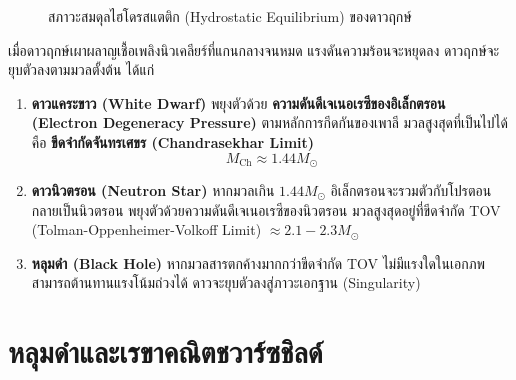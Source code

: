 \begin{figure}[H]
\centering
{}
\caption{สภาวะสมดุลไฮโดรสแตติก (Hydrostatic Equilibrium) ของดาวฤกษ์}
\label{fig:hydrostatic_equilibrium}
\end{figure}

เมื่อดาวฤกษ์เผาผลาญเชื้อเพลิงนิวเคลียร์ที่แกนกลางจนหมด แรงดันความร้อนจะหยุดลง ดาวฤกษ์จะยุบตัวลงตามมวลตั้งต้น ได้แก่
\begin{enumerate}
    \item \textbf{ดาวแคระขาว (White Dwarf)} พยุงตัวด้วย \textbf{ความดันดีเจเนอเรซีของอิเล็กตรอน (Electron Degeneracy Pressure)} ตามหลักการกีดกันของเพาลี มวลสูงสุดที่เป็นไปได้คือ \textbf{ขีดจำกัดจันทรเศขร (Chandrasekhar Limit)}
    \begin{equation}
    M_{\text{Ch}} \approx 1.44 M_\odot
    \end{equation}
    \item \textbf{ดาวนิวตรอน (Neutron Star)} หากมวลเกิน $1.44 M_\odot$ อิเล็กตรอนจะรวมตัวกับโปรตอนกลายเป็นนิวตรอน พยุงตัวด้วยความดันดีเจเนอเรซีของนิวตรอน มวลสูงสุดอยู่ที่ขีดจำกัด TOV (Tolman-Oppenheimer-Volkoff Limit) $\approx 2.1 - 2.3 M_\odot$
    \item \textbf{หลุมดำ (Black Hole)} หากมวลสารตกค้างมากกว่าขีดจำกัด TOV ไม่มีแรงใดในเอกภพสามารถต้านทานแรงโน้มถ่วงได้ ดาวจะยุบตัวลงสู่ภาวะเอกฐาน (Singularity)
\end{enumerate}

\section{หลุมดำและเรขาคณิตชวาร์ซชิลด์}

